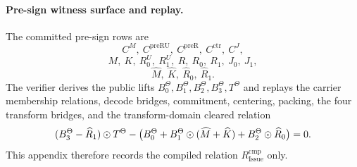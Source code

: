 \paragraph{Pre-sign witness surface and replay.}
The committed pre-sign rows are
\[
  C^M,\ C^{\mathrm{preRU}},\ C^{\mathrm{preR}},\ C^{\mathrm{ctr}},\ C^J,
\]
\[
  M,\ K,\ R_0^U,\ R_1^U,\ R,\ R_0,\ R_1,\ J_0,\ J_1,
\]
\[
  \widehat M,\ \widehat K,\ \widehat R_0,\ \widehat R_1.
\]
The verifier derives the public lifts
\(B_0^\Theta,B_1^\Theta,B_2^\Theta,B_3^\Theta,T^\Theta\) and replays the
carrier membership relations, decode bridges, commitment, centering, packing,
the four transform bridges, and the transform-domain cleared relation
\[
(B_3^\Theta-\widehat R_1)\odot T^\Theta
-
\bigl(B_0^\Theta + B_1^\Theta\odot (\widehat M+\widehat K)+B_2^\Theta \odot \widehat R_0\bigr)=0.
\]
This appendix therefore records the compiled relation
\(R_{\mathrm{Issue}}^{\mathrm{cmp}}\) only.

